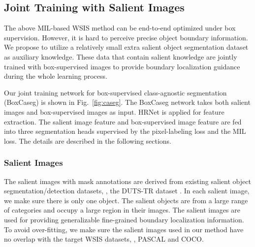\documentclass[final]{cvpr}
\begin{document}
\subsection{Joint Training with Salient Images}\label{Sec:Joint_train}

The above MIL-based WSIS method can be end-to-end optimized under box supervision. However, it is hard to perceive precise object boundary information. We propose to utilize a relatively small extra salient object segmentation dataset as auxiliary knowledge. These data that contain salient knowledge are jointly trained with box-supervised images to provide boundary localization guidance during the whole learning process.

Our joint training network for box-supervised class-agnostic segmentation (BoxCaseg) is shown in Fig.~\ref{fig:caseg}. The BoxCaseg network takes both salient images and box-supervised images as input. HRNet \cite{wang2020deep} is applied for feature extraction. The salient image feature and box-supervised image feature are fed into three segmentation heads supervised by the pixel-labeling loss and the MIL loss. The details are described in the following sections.



\vspace{-3mm}
\subsubsection{Salient Images}
\vspace{-2mm}
The salient images with mask annotations are derived from existing salient object segmentation/detection datasets, \eg, the DUTS-TR dataset \cite{wang2017learning}. In each salient image, we make sure there is only one object. The salient objects are from a large range of categories and occupy a large region in their images. The salient images are used for providing generalizable fine-grained boundary localization information. To avoid over-fitting, we make sure the salient images used in our method have no overlap with the target WSIS datasets, \eg, PASCAL and COCO. 

\vspace{-3mm}
\end{document}
